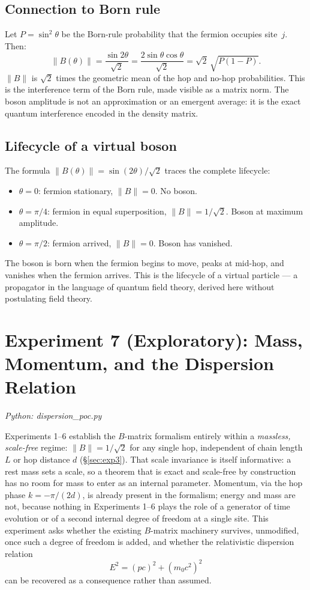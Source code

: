 \documentclass[11pt]{article}
\begin{document}
\subsection*{Connection to Born rule}

Let $P = \sin^2\theta$ be the Born-rule probability that the fermion occupies
site~$j$.
Then:
\[
  \|B(\theta)\| = \frac{\sin 2\theta}{\sqrt{2}}
  = \frac{2\sin\theta\cos\theta}{\sqrt{2}}
  = \sqrt{2}\,\sqrt{P(1-P)}.
\]
$\|B\|$ is $\sqrt{2}$ times the geometric mean of the hop and no-hop
probabilities.
This is the interference term of the Born rule, made visible as a matrix norm.
The boson amplitude is not an approximation or an emergent average: it is the
exact quantum interference encoded in the density matrix.

\subsection*{Lifecycle of a virtual boson}

The formula $\|B(\theta)\| = \sin(2\theta)/\sqrt{2}$ traces the complete
lifecycle:
\begin{itemize}
  \item $\theta = 0$: fermion stationary, $\|B\| = 0$. No boson.
  \item $\theta = \pi/4$: fermion in equal superposition, $\|B\| = 1/\sqrt{2}$. Boson at maximum amplitude.
  \item $\theta = \pi/2$: fermion arrived, $\|B\| = 0$. Boson has vanished.
\end{itemize}
The boson is born when the fermion begins to move, peaks at mid-hop,
and vanishes when the fermion arrives.
This is the lifecycle of a virtual particle --- a propagator in the language of
quantum field theory, derived here without postulating field theory.

\section{Experiment 7 (Exploratory): Mass, Momentum, and the Dispersion Relation}
\label{sec:exp7}

\textit{Python: dispersion\_poc.py}

Experiments 1--6 establish the $B$-matrix formalism entirely within a
\emph{massless, scale-free} regime: $\|B\| = 1/\sqrt{2}$ for any single hop,
independent of chain length $L$ or hop distance $d$ (\S\ref{sec:exp3}).
That scale invariance is itself informative: a rest mass sets a scale, so a
theorem that is exact and scale-free by construction has no room for mass to
enter as an internal parameter. Momentum, via the hop phase $k = -\pi/(2d)$,
is already present in the formalism; energy and mass are not, because nothing
in Experiments 1--6 plays the role of a generator of time evolution or of a
second internal degree of freedom at a single site. This experiment asks
whether the existing $B$-matrix machinery survives, unmodified, once such a
degree of freedom is added, and whether the relativistic dispersion relation
\[
  E^2 = (pc)^2 + (m_0c^2)^2
\]
can be recovered as a consequence rather than assumed.
\end{document}
